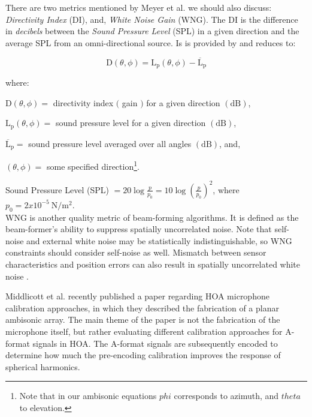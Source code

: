 There are two metrics mentioned by Meyer et al. we should also discuss: \textit{Directivity Index} (DI), and, \textit{White Noise Gain} (WNG). The DI is the difference in \textit{decibels} between the \textit{Sound Pressure Level} (SPL) in a given direction and the average SPL from an omni-directional source. Is is provided by \cite{LONG201439} and reduces to:

$$
\mathrm{D}(\theta, \phi)=\mathrm{L}_{\mathrm{p}}(\theta, \phi)-\overline{\mathrm{L}}_{\mathrm{p}}
$$

\noindent where:
\begin{description}
\item  $\mathrm{D}(\theta, \phi)=$ directivity index $($ gain $)$ for a given direction $(\mathrm{dB})$,
\item  $\mathrm{L}_{\mathrm{p}}(\theta, \phi)=$ sound pressure level for a given direction $(\mathrm{dB})$,
\item $\overline{\mathrm{L}}_{\mathrm{p}}=$ sound pressure level averaged over all angles $(\mathrm{dB})$, and,
\item  $(\theta, \phi)=$ some specified direction\footnote{Note that in our ambisonic equations $phi$ corresponds to azimuth, and $theta$ to elevation.}. \\
\end{description}

Sound Pressure Level (SPL) $=20 \log \frac{p}{p_{0}}=10 \log \left(\frac{p}{p_{0}}\right)^{2}$, where $p_{0}=2 x 10^{-5} \mathrm{~N} / \mathrm{m}^{2}$. \\ 


WNG is another quality metric of beam-forming algorithms. It is defined as the beam-former's ability to suppress spatially uncorrelated noise. Note that self-noise and external white noise may be statistically indistinguishable, so WNG constraints should consider self-noise as well. Mismatch between sensor characteristics and position errors can also result in spatially uncorrelated white noise \cite{mabande2009design}. 




Middlicott et al. \cite{middlicott2019calibration} recently published a paper regarding HOA microphone calibration approaches, in which they described the fabrication of a planar ambisonic array. The main theme of the paper is not the fabrication of the microphone itself, but rather evaluating different calibration approaches for A-format signals in HOA. The A-format signals are subsequently encoded to determine how much the pre-encoding calibration improves the response of spherical harmonics. 

